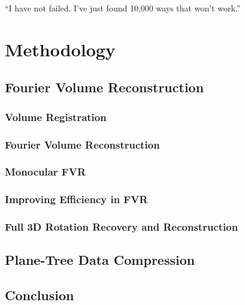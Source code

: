 \begin{savequote}[8cm]
  ``I have not failed. I've just found 10,000 ways that won't work.''
\end{savequote}
\makeatletter
\chapter{Methodology}


\section{Fourier Volume Reconstruction}
\label{FVRSectionA}


\subsection{Volume Registration} \label{Sec:VolumeRegistrationSection}


\subsection{Fourier Volume Reconstruction} \label{Sec:AFVRApproach}


\subsection{Monocular FVR} 
\label{Sec:AMonoFVRApproach}


\subsection{Improving Efficiency in FVR} \label{Sec:Efficiency}


\subsection{Full 3D Rotation Recovery and Reconstruction}




\section{Plane-Tree Data Compression}



\section{Conclusion}